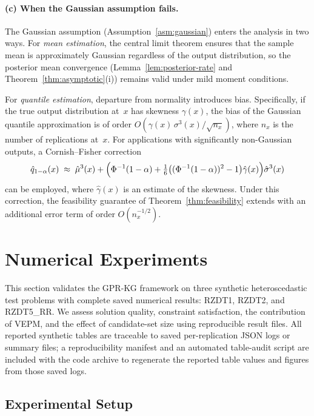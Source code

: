 \documentclass[12pt]{article}
\theoremstyle{plain}
\theoremstyle{definition}
\theoremstyle{remark}
\begin{document}
\paragraph{(c) When the Gaussian assumption fails.}
The Gaussian assumption (Assumption~\ref{asm:gaussian}) enters the
analysis in two ways.  For \emph{mean estimation}, the central limit
theorem ensures that the sample mean is approximately Gaussian regardless
of the output distribution, so the posterior mean convergence
(Lemma~\ref{lem:posterior-rate} and Theorem~\ref{thm:asymptotic}(i))
remains valid under mild moment conditions.

For \emph{quantile estimation}, departure from normality introduces bias.
Specifically, if the true output distribution at~$x$ has skewness
$\gamma(x)$, the bias of the Gaussian quantile approximation is of order
$O(\gamma(x)\,\sigma^{3}(x)/\sqrt{n_{x}})$, where $n_{x}$ is the number
of replications at~$x$.  For applications with significantly non-Gaussian
outputs, a Cornish--Fisher correction
\[
  \hat{q}_{1-\alpha}(x)
  \;\approx\;
  \hat{\mu}^{3}(x)
  + \Bigl(\Phi^{-1}(1-\alpha)
    +\tfrac{1}{6}\bigl((\Phi^{-1}(1-\alpha))^{2}-1\bigr)\hat{\gamma}(x)
  \Bigr)\hat{\sigma}^{3}(x)
\]
can be employed, where $\hat{\gamma}(x)$ is an estimate of the skewness.
Under this correction, the feasibility guarantee of
Theorem~\ref{thm:feasibility} extends with an additional error term of
order $O(n_{x}^{-1/2})$.

\section{Numerical Experiments}\label{sec:experiments}

This section validates the GPR-KG framework on three synthetic
heteroscedastic test problems with complete saved numerical results:
RZDT1, RZDT2, and RZDT5\_RR.  We assess solution quality, constraint
satisfaction, the contribution of VEPM, and the effect of candidate-set
size using reproducible result files.
All reported synthetic tables are traceable to saved per-replication
JSON logs or summary files; a reproducibility manifest and an automated
table-audit script are included with the code archive to regenerate the
reported table values and figures from those saved logs.

\subsection{Experimental Setup}\label{subsec:exp_setup}
\end{document}
